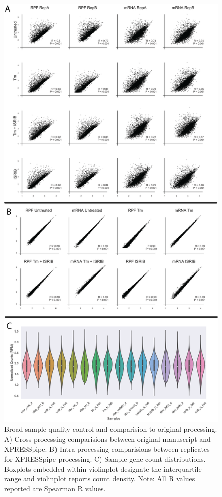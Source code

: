 \documentclass[11pt, a4paper, oneside]{article}
\begin{document}
\begin{figure}
\centering
  \includegraphics[width=160mm]{figures/xpresspipe_figure2.png}
  \caption{Broad sample quality control and comparision to original processing. A) Cross-processing comparisions between original manuscript and XPRESSpipe. B) Intra-processing comparisions between replicates for XPRESSpipe processing. C) Sample gene count distributions. Boxplots embedded within violinplot designate the interquartile range and violinplot reports count density. Note: All R values reported are Spearman R values.}
  \label{fig:figure2}
\end{figure}
\end{document}
